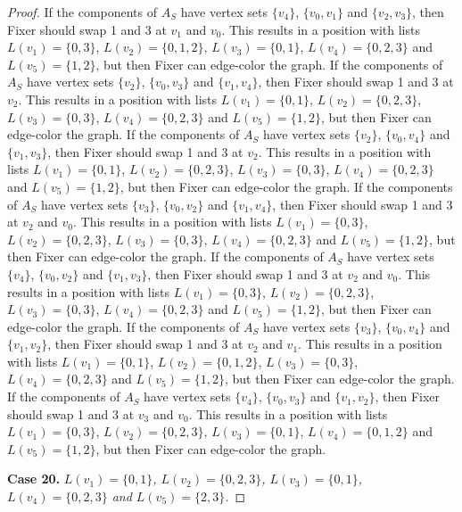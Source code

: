 \documentclass[12pt]{amsart}
\theoremstyle{plain}
\theoremstyle{definition}
\theoremstyle{remark}
\begin{document}
\begin{proof}
If the components of $A_S$ have vertex sets $\{v_4\}$, $\{v_0, v_1\}$ and $\{v_2, v_3\}$, then Fixer should swap 1 and 3 at $v_1$ and $v_0$. This results in a position with lists $L(v_1) = \{0, 3\}$, $L(v_2) = \{0, 1, 2\}$, $L(v_3) = \{0, 1\}$, $L(v_4) = \{0, 2, 3\}$ and $L(v_5) = \{1, 2\}$, but then Fixer can edge-color the graph.
If the components of $A_S$ have vertex sets $\{v_2\}$, $\{v_0, v_3\}$ and $\{v_1, v_4\}$, then Fixer should swap 1 and 3 at $v_2$. This results in a position with lists $L(v_1) = \{0, 1\}$, $L(v_2) = \{0, 2, 3\}$, $L(v_3) = \{0, 3\}$, $L(v_4) = \{0, 2, 3\}$ and $L(v_5) = \{1, 2\}$, but then Fixer can edge-color the graph.
If the components of $A_S$ have vertex sets $\{v_2\}$, $\{v_0, v_4\}$ and $\{v_1, v_3\}$, then Fixer should swap 1 and 3 at $v_2$. This results in a position with lists $L(v_1) = \{0, 1\}$, $L(v_2) = \{0, 2, 3\}$, $L(v_3) = \{0, 3\}$, $L(v_4) = \{0, 2, 3\}$ and $L(v_5) = \{1, 2\}$, but then Fixer can edge-color the graph.
If the components of $A_S$ have vertex sets $\{v_3\}$, $\{v_0, v_2\}$ and $\{v_1, v_4\}$, then Fixer should swap 1 and 3 at $v_2$ and $v_0$. This results in a position with lists $L(v_1) = \{0, 3\}$, $L(v_2) = \{0, 2, 3\}$, $L(v_3) = \{0, 3\}$, $L(v_4) = \{0, 2, 3\}$ and $L(v_5) = \{1, 2\}$, but then Fixer can edge-color the graph.
If the components of $A_S$ have vertex sets $\{v_4\}$, $\{v_0, v_2\}$ and $\{v_1, v_3\}$, then Fixer should swap 1 and 3 at $v_2$ and $v_0$. This results in a position with lists $L(v_1) = \{0, 3\}$, $L(v_2) = \{0, 2, 3\}$, $L(v_3) = \{0, 3\}$, $L(v_4) = \{0, 2, 3\}$ and $L(v_5) = \{1, 2\}$, but then Fixer can edge-color the graph.
If the components of $A_S$ have vertex sets $\{v_3\}$, $\{v_0, v_4\}$ and $\{v_1, v_2\}$, then Fixer should swap 1 and 3 at $v_2$ and $v_1$. This results in a position with lists $L(v_1) = \{0, 1\}$, $L(v_2) = \{0, 1, 2\}$, $L(v_3) = \{0, 3\}$, $L(v_4) = \{0, 2, 3\}$ and $L(v_5) = \{1, 2\}$, but then Fixer can edge-color the graph.
If the components of $A_S$ have vertex sets $\{v_4\}$, $\{v_0, v_3\}$ and $\{v_1, v_2\}$, then Fixer should swap 1 and 3 at $v_3$ and $v_0$. This results in a position with lists $L(v_1) = \{0, 3\}$, $L(v_2) = \{0, 2, 3\}$, $L(v_3) = \{0, 1\}$, $L(v_4) = \{0, 1, 2\}$ and $L(v_5) = \{1, 2\}$, but then Fixer can edge-color the graph.

\noindent\textbf{Case 20.  }\textit{$L(v_1) = \{0, 1\}$, $L(v_2) = \{0, 2, 3\}$, $L(v_3) = \{0, 1\}$, $L(v_4) = \{0, 2, 3\}$ and $L(v_5) = \{2, 3\}$.}


\end{proof}
\end{document}
